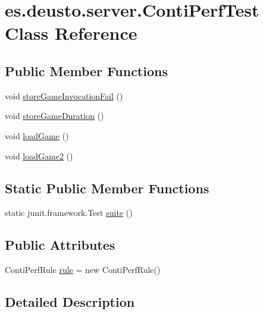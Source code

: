 \hypertarget{classes_1_1deusto_1_1server_1_1_conti_perf_test}{}\section{es.\+deusto.\+server.\+Conti\+Perf\+Test Class Reference}
\label{classes_1_1deusto_1_1server_1_1_conti_perf_test}
\subsection*{Public Member Functions}
\begin{DoxyCompactItemize}
\item 
void \hyperlink{classes_1_1deusto_1_1server_1_1_conti_perf_test_ae0b0bd4dc05c61facbe80fac922ecdfa}{store\+Game\+Invocation\+Fail} ()
\item 
void \hyperlink{classes_1_1deusto_1_1server_1_1_conti_perf_test_a9d54db7715e9086710eb3c68b21b1013}{store\+Game\+Duration} ()
\item 
void \hyperlink{classes_1_1deusto_1_1server_1_1_conti_perf_test_aa7b6dc37eb9e76dd62e4f9040f7f7da9}{load\+Game} ()
\item 
void \hyperlink{classes_1_1deusto_1_1server_1_1_conti_perf_test_a980b2db90ab40f9bc7c7ec6ec3fcac4d}{load\+Game2} ()
\end{DoxyCompactItemize}
\subsection*{Static Public Member Functions}
\begin{DoxyCompactItemize}
\item 
static junit.\+framework.\+Test \hyperlink{classes_1_1deusto_1_1server_1_1_conti_perf_test_abe1f2e0ee16352a969c96e46dd35d770}{suite} ()
\end{DoxyCompactItemize}
\subsection*{Public Attributes}
\begin{DoxyCompactItemize}
\item 
Conti\+Perf\+Rule \hyperlink{classes_1_1deusto_1_1server_1_1_conti_perf_test_a36643de9d25126a2f4d24e6b61987c31}{rule} = new Conti\+Perf\+Rule()
\end{DoxyCompactItemize}


\subsection{Detailed Description}


